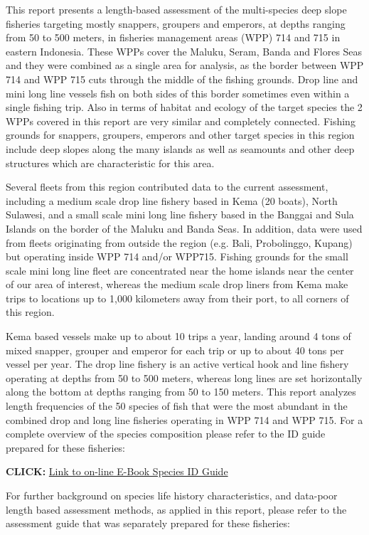 This report presents a length-based assessment of the multi-species deep slope fisheries targeting mostly snappers, groupers and emperors, at depths ranging from 50 to 500 meters, in fisheries management areas (WPP) 714 and 715 in eastern Indonesia. These WPPs cover the Maluku, Seram, Banda and Flores Seas and they were combined as a single area for analysis, as the border between WPP 714 and WPP 715 cuts through the middle of the fishing grounds. Drop line and mini long line vessels fish on both sides of this border sometimes even within a single fishing trip. Also in terms of habitat and ecology of the target species the 2 WPPs covered in this report are very similar and completely connected. Fishing grounds for snappers, groupers, emperors and other target species in this region include deep slopes along the many islands as well as seamounts and other deep structures which are characteristic for this area.

Several fleets from this region contributed data to the current assessment, including a medium scale drop line fishery based in Kema (20 boats), North Sulawesi, and a small scale mini long line fishery based in the Banggai and Sula Islands on the border of the Maluku and Banda Seas. In addition, data were used from fleets originating from outside the region (e.g. Bali, Probolinggo, Kupang) but operating inside WPP 714 and/or WPP715. Fishing grounds for the small scale mini long line fleet are concentrated near the home islands near the center of our area of interest, whereas the medium scale drop liners from Kema make trips to locations up to 1,000 kilometers away from their port, to all corners of this region.

Kema based vessels make up to about 10 trips a year, landing around 4 tons of mixed snapper, grouper and emperor for each trip or up to about 40 tons per vessel per year. The drop line fishery is an active vertical hook and line fishery operating at depths from 50 to 500 meters, whereas long lines are set horizontally along the bottom at depths ranging from 50 to 150 meters. This report analyzes length frequencies of the 50 species of fish that were the most abundant in the combined drop and long line fisheries operating in WPP 714 and WPP 715. For a complete overview of the species composition please refer to the ID guide prepared for these fisheries:

\textbf{CLICK: }\href{http://72.14.187.103:8080/ifish/pub/TNC_FishID.pdf}{Link to on-line E-Book Species ID Guide}

For further background on species life history characteristics, and data-poor length based assessment methods, as applied in this report, please refer to the assessment guide that was separately prepared for these fisheries:

